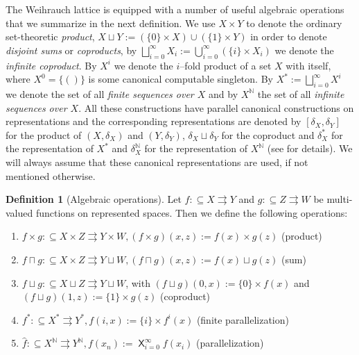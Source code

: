 \documentclass[a4paper]{amsart}
\def\IN{{\mathbb{N}}}
\def\In{\subseteq}
\def\mto{\rightrightarrows}
\def\bigtimes{\mathop{\mathsf{X}}}
\theoremstyle{definition}
\newtheorem{definition}[theorem]{Definition}
\begin{document}
The Weihrauch lattice is equipped with a number of useful algebraic operations that we summarize in the next definition.
We use $X\times Y$ to denote the ordinary set-theoretic {\em product}, $X\sqcup Y:=(\{0\}\times X)\cup(\{1\}\times Y)$ in order
to denote {\em disjoint sums} or {\em coproducts}, by $\bigsqcup_{i=0}^\infty X_i:=\bigcup_{i=0}^\infty(\{i\}\times X_i)$ we denote the 
{\em infinite coproduct}. By $X^i$ we denote the $i$--fold product of a set $X$ with itself, where $X^0=\{()\}$ is some canonical computable singleton.
By $X^*:=\bigsqcup_{i=0}^\infty X^i$ we denote the set of all {\em finite sequences over $X$}
and by $X^\IN$ the set of all {\em infinite sequences over $X$}. 
All these constructions have parallel canonical constructions on representations and the corresponding representations
are denoted by $[\delta_X,\delta_Y]$ for the product of $(X,\delta_X)$ and $(Y,\delta_Y)$, $\delta_X\sqcup\delta_Y$
for the coproduct and $\delta^*_X$ for the representation of $X^*$ and $\delta_X^\IN$ for the representation
of $X^\IN$ (see \cite{BG11,Pau09,BBP12} for details). We will always assume that these canonical representations
are used, if not mentioned otherwise. 

\begin{definition}[Algebraic operations]
\label{def:algebraic-operations}
Let $f:\In X\mto Y$ and $g:\In Z\mto W$ be multi-valued functions on represented spaces. Then we define
the following operations:
\begin{enumerate}
\itemsep 0.2cm
\item $f\times g:\In X\times Z\mto Y\times W, (f\times g)(x,z):=f(x)\times g(z)$ \hfill (product)
\item $f\sqcap g:\In X\times Z\mto Y\sqcup W, (f\sqcap g)(x,z):=f(x)\sqcup g(z)$ \hfill (sum)
\item $f\sqcup g:\In X\sqcup Z\mto Y\sqcup W$, with $(f\sqcup g)(0,x):=\{0\}\times f(x)$ and\\
        $(f\sqcup g)(1,z):=\{1\}\times g(z)$ \hfill (coproduct)
\item $f^*:\In X^*\mto Y^*,f(i,x):=\{i\}\times f^i(x)$ \hfill (finite parallelization)
\item $\widehat{f}:\In X^\IN\mto Y^\IN,f(x_n):=\bigtimes_{i=0}^\infty f(x_i)$ \hfill (parallelization)
\end{enumerate}
\end{definition}
\end{document}
